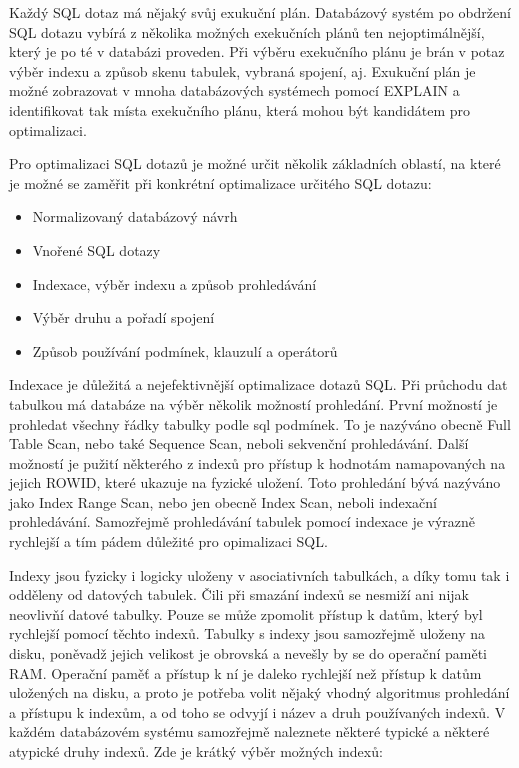 \documentclass[12pt]{article}
\begin{document}
Každý SQL dotaz má nějaký svůj exukuční plán. Databázový systém po obdržení SQL dotazu vybírá z několika možných exekučních plánů ten nejoptimálnější, který je po té v databázi proveden. Při výběru exekučního plánu je brán v potaz výběr indexu a způsob skenu tabulek, vybraná spojení, aj. Exukuční plán je možné zobrazovat v mnoha databázových systémech pomocí EXPLAIN a identifikovat tak místa exekučního plánu, která mohou být kandidátem pro optimalizaci.\cite{optimalizace-sql}

Pro optimalizaci SQL dotazů je možné určit několik základních oblastí, na které je možné se zaměřit při konkrétní optimalizace určitého SQL dotazu:

\begin{itemize}
\item Normalizovaný databázový návrh
\item Vnořené SQL dotazy
\item Indexace, výběr indexu a způsob prohledávání
\item Výběr druhu a pořadí spojení
\item Způsob používání podmínek, klauzulí a operátorů
\end{itemize}

Indexace je důležitá a nejefektivnější optimalizace dotazů SQL. Při průchodu dat tabulkou má databáze na výběr několik možností prohledání. První možností je prohledat všechny řádky tabulky podle sql podmínek. To je nazýváno obecně Full Table Scan, nebo také Sequence Scan, neboli sekvenční prohledávání. Další možností je pužití některého z indexů pro přístup k hodnotám namapovaných na jejich ROWID, které ukazuje na fyzické uložení. Toto prohledání bývá nazýváno jako Index Range Scan, nebo jen obecně Index Scan, neboli indexační prohledávání. Samozřejmě prohledávání tabulek pomocí indexace je výrazně rychlejší a tím pádem důležité pro opimalizaci SQL. \cite{optimalizace-sql}

Indexy jsou fyzicky i logicky uloženy v asociativních tabulkách, a díky tomu tak i odděleny od datových tabulek. Čili při smazání indexů se nesmiží ani nijak neovlivňí datové tabulky. Pouze se může zpomolit přístup k datům, který byl rychlejší pomocí těchto indexů. Tabulky s indexy jsou samozřejmě uloženy na disku, poněvadž jejich velikost je obrovská a nevešly by se do operační paměti RAM. Operační paměť a přístup k ní je daleko rychlejší než přístup k datům uložených na disku, a proto je potřeba volit nějaký vhodný algoritmus prohledání a přístupu k indexům, a od toho se odvyjí i název a druh používaných indexů. V každém databázovém systému samozřejmě naleznete některé typické a některé atypické druhy indexů. \cite{optimalizace-sql} Zde je krátký výběr možných indexů:
\end{document}
